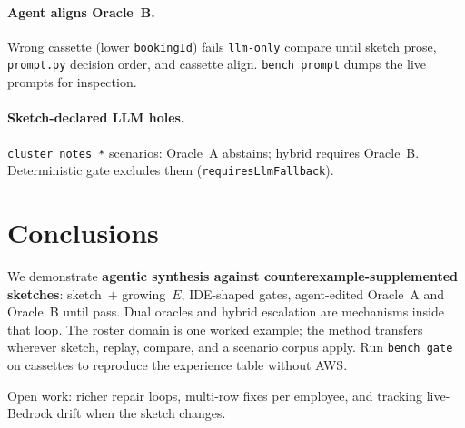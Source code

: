 \documentclass[11pt]{article}
\begin{document}
\paragraph{Agent aligns Oracle~B.}
Wrong cassette (lower \texttt{bookingId}) fails \texttt{llm-only} compare until sketch
prose, \texttt{prompt.py} decision order, and cassette align. \texttt{bench prompt} dumps
the live prompts for inspection.

\paragraph{Sketch-declared LLM holes.}
\texttt{cluster\_notes\_*} scenarios: Oracle~A abstains; hybrid requires Oracle~B.
Deterministic gate excludes them (\texttt{requiresLlmFallback}).

\section{Conclusions}
\label{sec:conclusions}

We demonstrate \textbf{agentic synthesis against counterexample-supplemented sketches}:
sketch~$+$ growing~$E$, IDE-shaped gates, agent-edited Oracle~A and Oracle~B until pass.
Dual oracles and hybrid escalation are mechanisms inside that loop. The roster domain is
one worked example; the method transfers wherever sketch, replay, compare, and a scenario
corpus apply. Run \texttt{bench gate} on cassettes to reproduce the experience table without AWS.

Open work: richer repair loops, multi-row fixes per employee, and tracking live-Bedrock
drift when the sketch changes.



\end{document}

